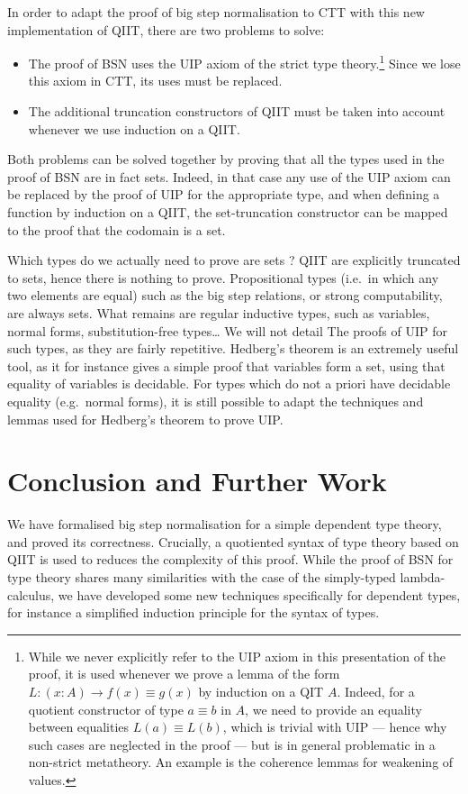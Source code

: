 \documentclass[a4paper,english]{lipics-v2019}
\begin{document}
In order to adapt the proof of big step normalisation to CTT with this new
implementation of QIIT, there are two problems to solve:
\begin{itemize}
\item The proof of BSN uses the UIP axiom of the strict type theory.\footnote{%
    While we never explicitly refer to the UIP axiom in this presentation of the
    proof, it is used whenever we prove a lemma of the form
    $L : (x : A) \to f(x) \equiv g(x)$ by induction on a QIT $A$.
    Indeed, for a quotient constructor of type $a \equiv b$ in $A$, we need to
    provide an equality between equalities $L(a) \equiv L(b)$, which is trivial
    with UIP --- hence why such cases are neglected in the proof --- but is
    in general problematic in a non-strict metatheory.
    An example is the coherence lemmas for weakening of values.
  }
  Since we lose this axiom in CTT, its uses must be replaced.
\item The additional truncation constructors of QIIT must be taken into account
  whenever we use induction on a QIIT.
\end{itemize}
Both problems can be solved together by proving that all the types used in the
proof of BSN are in fact sets. Indeed, in that case any use of the UIP axiom
can be replaced by the proof of UIP for the appropriate type, and when defining
a function by induction on a QIIT, the set-truncation constructor can be mapped
to the proof that the codomain is a set.

Which types do we actually need to prove are sets ? QIIT are explicitly
truncated to sets, hence there is nothing to prove. Propositional types (i.e.\
in which any two elements are equal) such as the big step relations, or strong
computability, are always sets. What remains are regular inductive types, such
as variables, normal forms, substitution-free types\dots{} We will not detail
The proofs of UIP for such types, as they are fairly repetitive. Hedberg's
theorem is an extremely useful tool, as it for instance gives a simple proof
that variables form a set, using that equality of variables is decidable.
For types which do not a priori have decidable equality (e.g.\ normal forms),
it is still possible to adapt the techniques and lemmas used for Hedberg's
theorem to prove UIP.

\section{Conclusion and Further Work}
We have formalised big step normalisation for a simple dependent type theory,
and proved its correctness. Crucially, a quotiented syntax of type theory based
on QIIT is used to reduces the complexity of this proof. While the proof of BSN
for type theory shares many similarities with the case of the simply-typed
lambda-calculus, we have developed some new techniques specifically for
dependent types, for instance a simplified induction principle for the syntax
of types.
\end{document}
